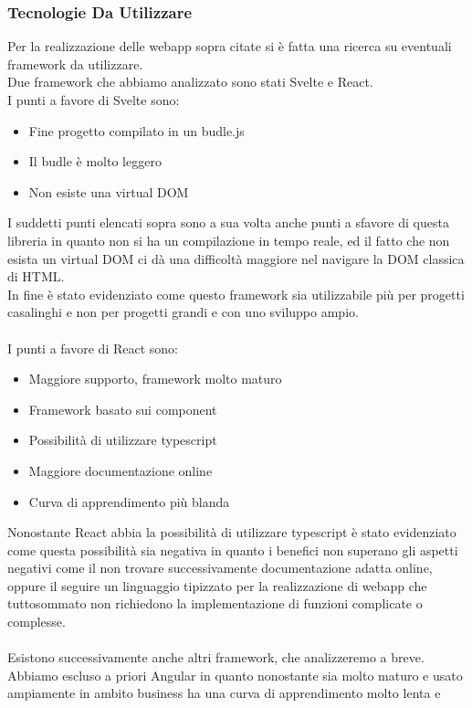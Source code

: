 \subsubsection{Tecnologie Da Utilizzare}
Per la realizzazione delle webapp sopra citate si è fatta una ricerca su eventuali framework da utilizzare.\\
Due framework che abbiamo analizzato sono stati Svelte e React.\\
I punti a favore di Svelte sono:
\begin{itemize}
	\item Fine progetto compilato in un budle.js
	\item Il budle è molto leggero
	\item Non esiste una virtual DOM
\end{itemize}
I suddetti punti elencati sopra sono a sua volta anche punti a sfavore di questa libreria in quanto non si ha un compilazione in tempo reale,
ed il fatto che non esista un virtual DOM ci dà una difficoltà maggiore nel navigare la DOM classica di HTML.\\
In fine è stato evidenziato come questo framework sia utilizzabile più per progetti casalinghi e non per progetti grandi e con uno sviluppo ampio.\\
\\
I punti a favore di React sono:
\begin{itemize}
	\item Maggiore supporto, framework molto maturo
	\item Framework basato sui component
	\item Possibilità di utilizzare typescript
	\item Maggiore documentazione online
	\item Curva di apprendimento più blanda
\end{itemize}
Nonostante React abbia la possibilità di utilizzare typescript è stato evidenziato come questa possibilità sia negativa in quanto i benefici non superano gli aspetti negativi come il non trovare successivamente documentazione 
adatta online, oppure il seguire un linguaggio tipizzato per la realizzazione di webapp che tuttosommato non richiedono la implementazione di funzioni complicate o complesse.\\
\\
Esistono successivamente anche altri framework, che analizzeremo a breve.\\
Abbiamo escluso a priori Angular in quanto nonostante sia molto maturo e usato ampiamente in ambito business ha una curva di apprendimento molto lenta e 
